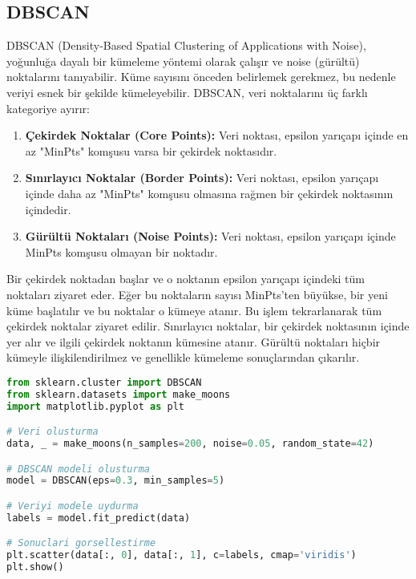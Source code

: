 \subsection{DBSCAN}
DBSCAN (Density-Based Spatial Clustering of Applications with Noise), yoğunluğa dayalı bir kümeleme yöntemi olarak çalışır ve noise (gürültü) noktalarını tanıyabilir. Küme sayısını önceden belirlemek gerekmez, bu nedenle veriyi esnek bir şekilde kümeleyebilir. DBSCAN, veri noktalarını üç farklı kategoriye ayırır:
\begin{enumerate}
    \item \textbf{Çekirdek Noktalar (Core Points):} Veri noktası, epsilon yarıçapı içinde en az "MinPts" komşusu varsa bir çekirdek noktasıdır.
    \item \textbf{Sınırlayıcı Noktalar (Border Points):} Veri noktası, epsilon yarıçapı içinde daha az "MinPts" komşusu olmasına rağmen bir çekirdek noktasının içindedir.
    \item \textbf{Gürültü Noktaları (Noise Points):} Veri noktası, epsilon yarıçapı içinde MinPts komşusu olmayan bir noktadır.
\end{enumerate}

Bir çekirdek noktadan başlar ve o noktanın epsilon yarıçapı içindeki tüm noktaları ziyaret eder. Eğer bu noktaların sayısı MinPts'ten büyükse, bir yeni küme başlatılır ve bu noktalar o kümeye atanır. Bu işlem tekrarlanarak tüm çekirdek noktalar ziyaret edilir. Sınırlayıcı noktalar, bir çekirdek noktasının içinde yer alır ve ilgili çekirdek noktanın kümesine atanır. Gürültü noktaları hiçbir kümeyle ilişkilendirilmez ve genellikle kümeleme sonuçlarından çıkarılır.

\begin{lstlisting}[language=Python, caption=Scikit-learn'de DBSCAN.]
from sklearn.cluster import DBSCAN
from sklearn.datasets import make_moons
import matplotlib.pyplot as plt

# Veri olusturma
data, _ = make_moons(n_samples=200, noise=0.05, random_state=42)

# DBSCAN modeli olusturma
model = DBSCAN(eps=0.3, min_samples=5)

# Veriyi modele uydurma
labels = model.fit_predict(data)

# Sonuclari gorsellestirme
plt.scatter(data[:, 0], data[:, 1], c=labels, cmap='viridis')
plt.show()
\end{lstlisting}

\newpage

